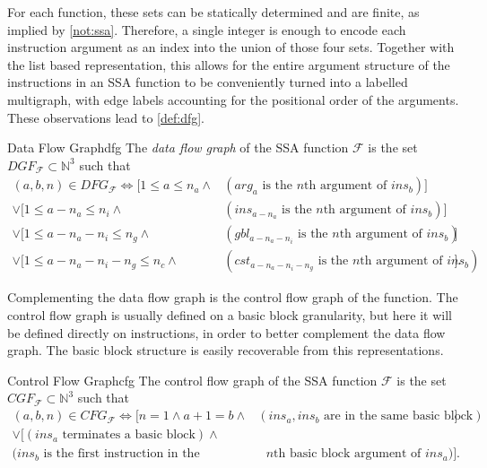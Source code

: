     For each function, these sets can be statically determined and are finite,
    as implied by \autoref{not:ssa}.
    Therefore, a single integer is enough to encode each instruction argument as
    an index into the union of those four sets.
    Together with the list based representation, this allows for the
    entire argument structure of the instructions in an SSA function to be
    conveniently turned into a labelled multigraph, with edge labels accounting
    for the positional order of the arguments.
    These observations lead to \autoref{def:dfg}.

\begin{definition}{Data Flow Graph}{dfg}
    The {\em data flow graph} of the SSA function $\mathcal F$ is the set
    $DGF_{\mathcal F}\subset \mathbb N^3$ such that
    \begin{align*}
        (a,b,n)\in DFG_{\mathcal F}\iff[1\leq a\leq n_a\land&(arg_a\text{ is the $n$th argument of }ins_b)] \\
                                   \lor[1\leq a-n_a\leq n_i\land&(ins_{a-n_a}\text{ is the $n$th argument of }ins_b)] \\
                                   \lor[1\leq a-n_a-n_i\leq n_g\land&(gbl_{a-n_a-n_i}\text{ is the $n$th argument of }ins_b)] \\
                                   \lor[1\leq a-n_a-n_i-n_g\leq n_c\land&(cst_{a-n_a-n_i-n_g}\text{ is the $n$th argument of }ins_b)].
    \end{align*}
\end{definition}

    Complementing the data flow graph is the control flow graph of the function.
    The control flow graph is usually defined on a basic block granularity, but
    here it will be defined directly on instructions, in order to better
    complement the data flow graph.
    The basic block structure is easily recoverable from this representations.

\begin{definition}{Control Flow Graph}{cfg}
    The control flow graph of the SSA function $\mathcal F$ is the set
    $CGF_{\mathcal F}\subset \mathbb N^3$ such that
    \begin{align*}
        (a,b,n)\in CFG_{\mathcal F}\iff[n=1\land a+1=b\land&(ins_a,ins_b\text{ are in the same basic block})] \\
                                   \lor[(ins_a\text{ terminates a basic block})\land&\\
                                        (ins_b\text{ is the first instruction in the}&\text{ $n$th basic block argument of }ins_a)].
    \end{align*}
\end{definition}

